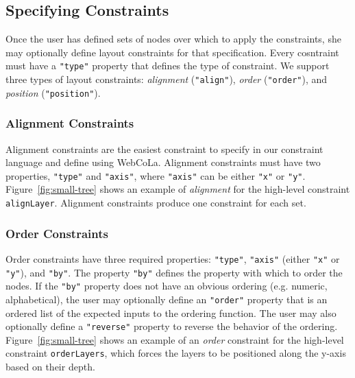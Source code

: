\subsection{Specifying Constraints}
Once the user has defined sets of nodes over which to apply the constraints, she may optionally define layout constraints for that specification. Every cosntraint must have a \texttt{"type"} property that defines the type of constraint. We support three types of layout constraints: \emph{alignment} (\texttt{"align"}), \emph{order} (\texttt{"order"}), and \emph{position} (\texttt{"position"}).

\subsubsection{Alignment Constraints}
Alignment constraints are the easiest constraint to specify in our constraint language and define using WebCoLa. Alignment constraints must have two properties, \texttt{"type"} and \texttt{"axis"}, where \texttt{"axis"} can be either \texttt{"x"} or \texttt{"y"}. Figure~\ref{fig:small-tree} shows an example of \emph{alignment} for the high-level constraint \texttt{alignLayer}. Alignment constraints produce one constraint for each set. 

\subsubsection{Order Constraints}
Order constraints have three required properties: \texttt{"type"}, \texttt{"axis"} (either \texttt{"x"} or \texttt{"y"}), and \texttt{"by"}. The property \texttt{"by"} defines the property with which to order the nodes. If the \texttt{"by"} property does not have an obvious ordering (e.g. numeric, alphabetical), the user may optionally define an \texttt{"order"} property that is an ordered list of the expected inputs to the ordering function. The user may also optionally define a \texttt{"reverse"} property to reverse the behavior of the ordering. Figure~\ref{fig:small-tree} shows an example of an \emph{order} constraint for the high-level constraint \texttt{orderLayers}, which forces the layers to be positioned along the y-axis based on their depth.

